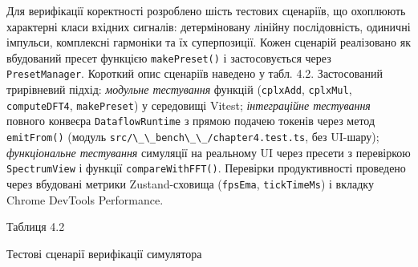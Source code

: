 \documentclass[
]{article}
\newcommand{\passthrough}[1]{#1}
\begin{document}
Для верифікації коректності розроблено шість тестових сценаріїв, що
охоплюють характерні класи вхідних сигналів: детерміновану лінійну
послідовність, одиничні імпульси, комплексні гармоніки та їх
суперпозиції. Кожен сценарій реалізовано як вбудований пресет функцією
\passthrough{\lstinline!makePreset!}\passthrough{\lstinline!()!} і
застосовується через \passthrough{\lstinline!PresetManager!}. Короткий
опис сценаріїв наведено у табл. 4.2. Застосований трирівневий підхід:
\emph{модульне тестування} функцій (\passthrough{\lstinline!cplxAdd!},
\passthrough{\lstinline!cplxMul!},
\passthrough{\lstinline!computeDFT!}\passthrough{\lstinline!4!},
\passthrough{\lstinline!makePreset!}) у середовищі Vitest;
\emph{інтеграційне тестування} повного конвеєра
\passthrough{\lstinline!DataflowRuntime!} з прямою подачею токенів через
метод \passthrough{\lstinline!emitFrom!}\passthrough{\lstinline!()!}
(модуль
\passthrough{\lstinline!src!}\passthrough{\lstinline!/\_\_!}\passthrough{\lstinline!bench!}\passthrough{\lstinline!\_\_/!}\passthrough{\lstinline!chapter!}\passthrough{\lstinline!4.!}\passthrough{\lstinline!test!}\passthrough{\lstinline!.!}\passthrough{\lstinline!ts!},
без UI-шару); \emph{функціональне тестування} симуляції на реальному UI
через пресети з перевіркою \passthrough{\lstinline!SpectrumView!} і
функції
\passthrough{\lstinline!compareWithFFT!}\passthrough{\lstinline!()!}.
Перевірки продуктивності проведено через вбудовані метрики
Zustand-сховища (\passthrough{\lstinline!fpsEma!},
\passthrough{\lstinline!tickTimeMs!}) і вкладку Chrome DevTools
Performance.

Таблиця 4.2

Тестові сценарії верифікації симулятора
\end{document}
